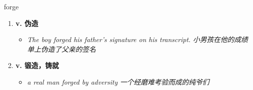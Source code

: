 
\begin{frame}
{\huge forge}
\begin{center}
\begin{enumerate}\Large
  \item \textbf{v. 伪造}
  \begin{itemize}
    \item \em{\Large{The boy forged his father’s signature on his transcript. 小男孩在他的成绩单上伪造了父亲的签名}}
  \end{itemize}
  \item \textbf{v. 锻造，铸就}
  \begin{itemize}
    \item \em{\Large{a real man forged by adversity 一个经磨难考验而成的纯爷们}}
  \end{itemize}
\end{enumerate}
\end{center}
\end{frame}
